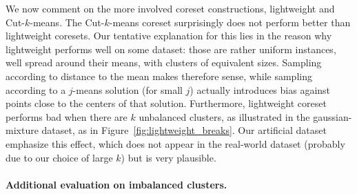 We now comment on the more involved coreset constructions, lightweight and Cut-$k$-means. The Cut-$k$-means coreset surprisingly does not perform better than
lightweight coresets. Our tentative explanation for this lies in the reason why lightweight performs well on some dataset: those are rather uniform instances, well
spread around their means, with clusters of equivalent sizes.  Sampling according to distance to the mean makes therefore sense,
while sampling according to a $j$-means solution (for small $j$) actually introduces bias against points close to the centers of that solution.  Furthermore,
lightweight coreset performs bad when there are $k$ unbalanced clusters, as illustrated in the gaussian-mixture dataset, as in
Figure~\ref{fig:lightweight_breaks}.  Our artificial dataset emphasize this effect, which does not appear in the real-world dataset (probably due to our choice
of large $k$) but is very plausible.  

\paragraph*{Additional evaluation on imbalanced clusters.}

